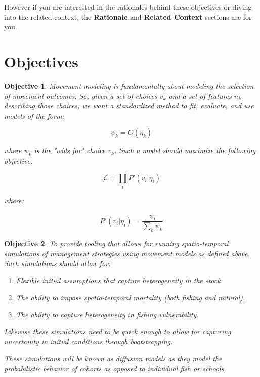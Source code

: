 \documentclass[11pt]{article}
\newtheorem{objective}{Objective}
\begin{document}
However if you are interested in the rationales behind these objectives or diving into the related context, the \textbf{Rationale} and \textbf{Related Context} sections are for you. 

\newpage


\tableofcontents
\newpage

\section{Objectives}

\begin{objective}
Movement modeling is fundamentally about modeling the selection of movement outcomes. So, given a set of choices $v_k$ and a set of features $n_k$ describing those choices, we want a standardized method to fit, evaluate, and use models of the form:

$$\psi_k = G(\eta_k)$$

where $\psi_k$ is the "odds for" choice $v_k$. Such a model should maximize the following objective:


$$\mathcal{L}=\prod_i P'(v_i | \eta_i)$$

where:

$$P'(v_i|\eta_i) = \frac{\psi_i}{\sum_k \psi_k}$$


\end{objective}

\begin{objective}
To provide tooling that allows for running spatio-temporal simulations of management strategies using movement models as defined above. Such simulations should allow for:

\begin{enumerate}
\item Flexible initial assumptions that capture heterogeneity in the stock.
\item The ability to impose spatio-temporal mortality (both fishing and natural).
\item The ability to capture heterogeneity in fishing vulnerability.
\end{enumerate}

Likewise these simulations need to be quick enough to allow for capturing uncertainty in initial conditions through bootstrapping.\newline

These simulations will be known as diffusion models as they model the probabilistic behavior of cohorts as opposed to individual fish or schools. 
\end{objective}
\end{document}
